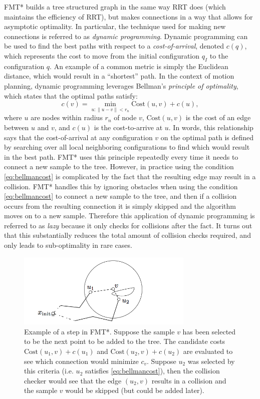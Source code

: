 FMT* builds a tree structured graph in the same way RRT does (which maintains the efficiency of RRT), but makes connections in a way that allows for asymptotic optimality. In particular, the technique used for making new connections is referred to as \textit{dynamic programming}. Dynamic programming can be used to find the best paths with respect to a \textit{cost-of-arrival}, denoted $c(q)$, which represents the cost to move from the initial configuration $q_I$ to the configuration $q$. An example of a common metric is simply the Euclidean distance, which would result in a ``shortest'' path. In the context of motion planning, dynamic programming leverages Bellman's \textit{principle of optimality}, which states that the optimal paths satisfy:
\begin{equation}
\label{eq:bellmancost}
c(v) = \min_{u:\lVert u - v\rVert < r_n} \text{Cost}(u, v) + c(u),
\end{equation}
where $u$ are nodes within radius $r_n$ of node $v$, $\text{Cost}(u, v)$ is the cost of an edge between $u$ and $v$, and $c(u)$ is the cost-to-arrive at $u$. In words, this relationship says that the cost-of-arrival at any configuration $v$ on the optimal path is defined by searching over all local neighboring configurations to find which would result in the best path. FMT* uses this principle repeatedly every time it needs to connect a new sample to the tree.
However, in practice using the condition \eqref{eq:bellmancost} is complicated by the fact that the resulting edge may result in a collision. FMT* handles this by ignoring obstacles when using the condition \eqref{eq:bellmancost} to connect a new sample to the tree, and then if a collision occurs from the resulting connection it is simply skipped and the algorithm moves on to a new sample. Therefore this application of dynamic programming is referred to as \textit{lazy} because it only checks for collisions after the fact. It turns out that this substantially reduces the total amount of collision checks required, and only leads to sub-optimality in rare cases.


\begin{figure}[ht]
  \centering
  \includegraphics[width=0.75\textwidth]{tex/figs/ch07_figs/fmt.png}
  \caption{Example of a step in FMT*. Suppose the sample $v$ has been selected to be the next point to be added to the tree. The candidate costs $\text{Cost}(u_1, v) + c(u_1)$ and $\text{Cost}(u_2, v) + c(u_2)$ are evaluated to see which connection would minimize $c_v$. Suppose $u_2$ was selected by this criteria (i.e. $u_2$ satisfies \eqref{eq:bellmancost}), then the collision checker would see that the edge $(u_2,v)$ results in a collision and the sample $v$ would be skipped (but could be added later).}
  \label{fig:plot_idea}
\end{figure}

